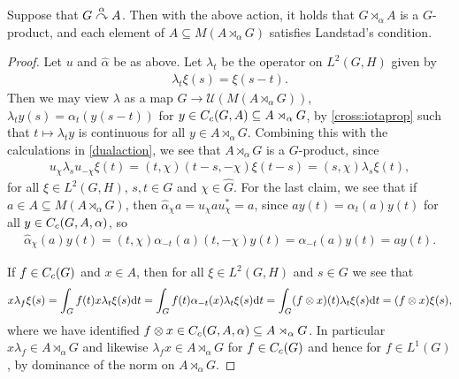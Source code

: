 \begin{lemma}
Suppose that $G \stackrel{\alpha}{\curvearrowright} A$. Then with the above action, it holds that $G \rtimes_\alpha A$ is a $G$-product, and each element of $A \subseteq M(A \rtimes_\alpha G)$ satisfies Landstad's condition.
\end{lemma}
\begin{proof}
Let $u$ and $\hat \alpha$ be as above. Let $\lambda_t$ be the operator on $L^2(G,H)$ given by
\begin{align*}
	\lambda_t \xi(s) = \xi(s-t).
\end{align*}
Then we may view $\lambda$ as a map $G \to \mathcal{U}(M(A \rtimes_\alpha G))$, $\lambda_t y(s) = \alpha_t (y(s-t))$ for $y \in C_c(G,A)\subseteq A \rtimes_\alpha G$, by \cref{cross:iotaprop} such that $t \mapsto \lambda_t y$ is continuous for all $y \in A \rtimes_\alpha G$. Combining this with the calculations in \cref{dualaction}, we see that $A \rtimes_\alpha G$ is a $G$-product, since
\begin{align*}
	u_\chi \lambda_s u_{-\chi} \xi(t) = (t,\chi) (t-s, - \chi) \xi(t-s) = (s, \chi) \lambda_s \xi(t),
\end{align*}
for all $\xi \in L^2(G,H)$, $s,t \in G$ and $\chi  \in \hat G$. For the last claim, we see that if $a \in A \subseteq M(A \rtimes_\alpha G)$, then $\hat \alpha_\chi a = u_\chi a u_\chi^* = a$, since $a y(t) = \alpha_t(a) y(t)$ for all $y \in C_c(G,A,\alpha)$, so
\begin{align*}
	\hat \alpha_\chi (a)y(t) = (t, \chi) \alpha_{-t}(a) (t,-\chi) y(t) = \alpha_{-t}(a) y(t) = ay(t).
\end{align*}

If $f \in C_c(G)$ and $x \in A$, then for all $\xi \in L^2(G,H)$ and $s \in G$ we see that
\begin{align*}
	x \lambda_f \xi(s) = \int_G f(t) x \lambda_t \xi(s) \mathrm{d} t = \int_G f(t) \alpha_{-t}(x) \lambda_t \xi(s) \mathrm{d} t = \int_G (f \otimes x)(t) \lambda_t \xi(s) \mathrm{d} t = (f \otimes x )\xi(s),
\end{align*}
where we have identified $f \otimes x \in C_c(G,A,\alpha)\subseteq A \rtimes_\alpha G$. In particular $x \lambda_f \in A \rtimes_\alpha G$ and likewise $\lambda_f x \in A \rtimes_\alpha G$ for $f \in C_c(G)$ and hence for $f \in L^1(G)$, by dominance of the norm on $A \rtimes_\alpha G$.
\end{proof}

